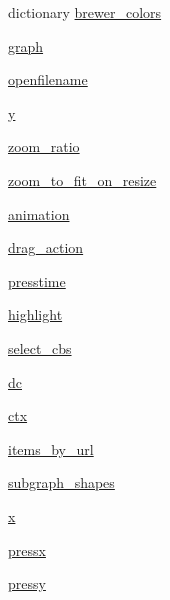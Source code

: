 \begin{DoxyCompactItemize}
\item 
dictionary \hyperlink{namespacesmacc__viewer_1_1xdot_1_1xdot__qt_af791111d29bdaa6facb116ad1989b5a6}{brewer\+\_\+colors}
\item 
\hyperlink{namespacesmacc__viewer_1_1xdot_1_1xdot__qt_a2319e52251767671674a2eedcf664b29}{graph}
\item 
\hyperlink{namespacesmacc__viewer_1_1xdot_1_1xdot__qt_adf013ec6582a49cdc769f0c185819576}{openfilename}
\item 
\hyperlink{namespacesmacc__viewer_1_1xdot_1_1xdot__qt_a784c76c541d5dd5940e217a1aa54f256}{y}
\item 
\hyperlink{namespacesmacc__viewer_1_1xdot_1_1xdot__qt_ab0b18c2a0f7367089860915decf159a1}{zoom\+\_\+ratio}
\item 
\hyperlink{namespacesmacc__viewer_1_1xdot_1_1xdot__qt_a8e9a2b5bda1c0aa66d24db77d9de1b9c}{zoom\+\_\+to\+\_\+fit\+\_\+on\+\_\+resize}
\item 
\hyperlink{namespacesmacc__viewer_1_1xdot_1_1xdot__qt_a564fb2ac32707a20c9ba6556130e9029}{animation}
\item 
\hyperlink{namespacesmacc__viewer_1_1xdot_1_1xdot__qt_aacf18e4b4f9d368501a082c11376c6a0}{drag\+\_\+action}
\item 
\hyperlink{namespacesmacc__viewer_1_1xdot_1_1xdot__qt_a10f9622c65d27d91de2d8e913ece0a8d}{presstime}
\item 
\hyperlink{namespacesmacc__viewer_1_1xdot_1_1xdot__qt_ab7970f10809cac5c23ebf9c6badb6d79}{highlight}
\item 
\hyperlink{namespacesmacc__viewer_1_1xdot_1_1xdot__qt_aa48da5b6608bcf353b02f3f34b134ce4}{select\+\_\+cbs}
\item 
\hyperlink{namespacesmacc__viewer_1_1xdot_1_1xdot__qt_a426c573b05d891f2649fb83a0a7a850b}{dc}
\item 
\hyperlink{namespacesmacc__viewer_1_1xdot_1_1xdot__qt_a9f8d32bd9e568c00c10171dc27e9483a}{ctx}
\item 
\hyperlink{namespacesmacc__viewer_1_1xdot_1_1xdot__qt_a1ea16c8736c98c601c48a91bae329cca}{items\+\_\+by\+\_\+url}
\item 
\hyperlink{namespacesmacc__viewer_1_1xdot_1_1xdot__qt_a1adb9f4f58f0f612cafb13be26ea275f}{subgraph\+\_\+shapes}
\item 
\hyperlink{namespacesmacc__viewer_1_1xdot_1_1xdot__qt_a1dd3d4e1f636ed9ebbed9b32d4c196df}{x}
\item 
\hyperlink{namespacesmacc__viewer_1_1xdot_1_1xdot__qt_a189c137edc6465a15787ea602ee4cb4f}{pressx}
\item 
\hyperlink{namespacesmacc__viewer_1_1xdot_1_1xdot__qt_a1af75ab8ceb248f57529be63462d6867}{pressy}
\end{DoxyCompactItemize}


